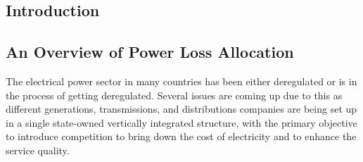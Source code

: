                                                                                                   

\begin{spacing}{1.3}
\chapter{Introduction}

%










\section{An Overview of Power Loss Allocation} %
The electrical power sector in many countries has been either deregulated or is in the process of getting deregulated. Several issues are coming up due to this as different generations, transmissions, and distributions companies are being set up in a single state-owned vertically integrated structure, with the primary objective to introduce competition to bring down the cost of electricity and to enhance the service quality. 


\end{spacing}
